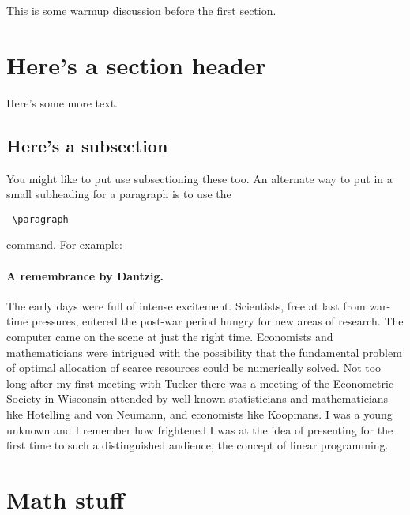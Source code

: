 \documentclass[12pt]{article}
\begin{document}
	\MakeScribeTop


This is some warmup discussion before the first section.

\section{Here's a section header}

Here's some more text.

\subsection{Here's a subsection}

You might like to put use subsectioning these too.  An alternate way to put in a small subheading for a paragraph is to use the \begin{verbatim} \paragraph \end{verbatim} command.  For example:

\paragraph{A remembrance by Dantzig.}  The early days were full of intense excitement. Scientists, free at last from war-time pressures, entered the post-war period hungry for new areas of research. The computer came on the scene at just the right time. Economists and mathematicians were intrigued with the possibility that the fundamental problem of optimal allocation of scarce resources could be numerically solved. Not too long after my first meeting with Tucker there was a meeting of the Econometric Society in Wisconsin attended by well-known statisticians and mathematicians like Hotelling and von Neumann, and economists like Koopmans. I was a young unknown and I remember how frightened I was at the idea of presenting for the first time to such a distinguished audience, the concept of linear programming.



\section{Math stuff}
\end{document}

